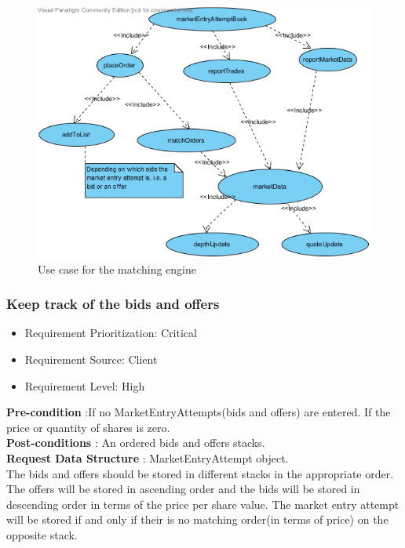 \documentclass[12pt]{article}
\begin{document}
						\begin{figure}[th]
						\centering
						\includegraphics[scale=0.8]{./matching_engine_use_case}
						\caption{Use case for the matching engine}
						\label{matching engine use case}
						\end{figure}
				\pagebreak
				
				\subsubsection{Keep track of the bids and offers}
						\begin{itemize}
							\item Requirement Prioritization: Critical
							\item Requirement Source: Client 
							\item Requirement Level: High	
						\end{itemize}
						
						\textbf{Pre-condition} :If no MarketEntryAttempts(bids and offers) are entered.
						If the price or quantity of shares is zero.\\ 
						\textbf{Post-conditions} : An ordered bids and offers stacks.\\ 
						\textbf{Request Data Structure} : MarketEntryAttempt object.\\
						
						The bids and offers should be stored in different stacks in the appropriate order. The offers will be stored in ascending order and the  bids will be stored in descending order in terms of the price per share value. The market entry attempt will be stored if and only if their is no matching order(in terms of price) on the opposite stack.\\
						
\end{document}
